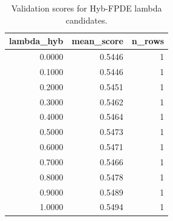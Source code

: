 \begin{table}[t]
\caption{Validation scores for Hyb-FPDE lambda candidates.}
\label{tab:lambda_distribution_computed}
\centering
\begin{tabular}{rrr}
\toprule
lambda\_hyb & mean\_score & n\_rows \\
\midrule
0.0000 & 0.5446 & 1 \\
0.1000 & 0.5446 & 1 \\
0.2000 & 0.5451 & 1 \\
0.3000 & 0.5462 & 1 \\
0.4000 & 0.5464 & 1 \\
0.5000 & 0.5473 & 1 \\
0.6000 & 0.5471 & 1 \\
0.7000 & 0.5466 & 1 \\
0.8000 & 0.5478 & 1 \\
0.9000 & 0.5489 & 1 \\
1.0000 & 0.5494 & 1 \\
\bottomrule
\end{tabular}

\end{table}
